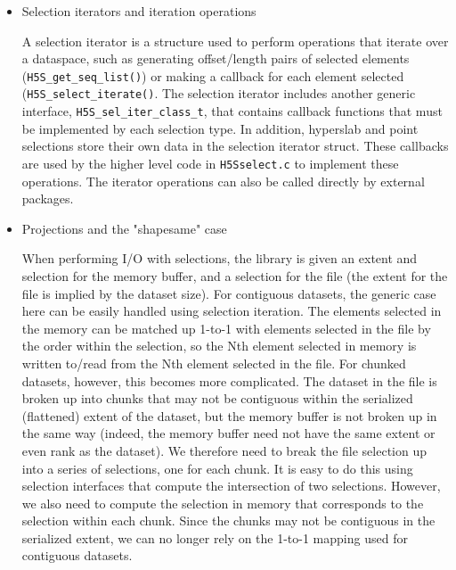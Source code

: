 \begin{itemize}
    \item Selection iterators and iteration operations

A selection iterator is a structure used to perform operations that iterate over a dataspace, such as generating offset/length pairs of selected elements (\texttt{H5S\_get\_seq\_list()}) or making a callback for each element selected (\texttt{H5S\_select\_iterate()}. The selection iterator includes another generic interface, \texttt{H5S\_sel\_iter\_class\_t}, that contains callback functions that must be implemented by each selection type. In addition, hyperslab and point selections store their own data in the selection iterator struct. These callbacks are used by the higher level code in \texttt{H5Sselect.c} to implement these operations. The iterator operations can also be called directly by external packages.

    \item Projections and the "shapesame" case

When performing I/O with selections, the library is given an extent and selection for the memory buffer, and a selection for the file (the extent for the file is implied by the dataset size). For contiguous datasets, the generic case here can be easily handled using selection iteration. The elements selected in the memory can be matched up 1-to-1 with elements selected in the file by the order within the selection, so the Nth element selected in memory is written to/read from the Nth element selected in the file. For chunked datasets, however, this becomes more complicated. The dataset in the file is broken up into chunks that may not be contiguous within the serialized (flattened) extent of the dataset, but the memory buffer is not broken up in the same way (indeed, the memory buffer need not have the same extent or even rank as the dataset). We therefore need to break the file selection up into a series of selections, one for each chunk. It is easy to do this using selection interfaces that compute the intersection of two selections. However, we also need to compute the selection in memory that corresponds to the selection within each chunk. Since the chunks may not be contiguous in the serialized extent, we can no longer rely on the 1-to-1 mapping used for contiguous datasets.


\end{itemize}
